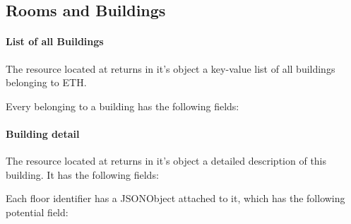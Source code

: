\subsection{Rooms and Buildings}

\paragraph{List of all Buildings}
The resource located at  returns in it's  object a key-value list of all buildings belonging to ETH.
\begin{description}
\end{description}
Every  belonging to a building has the following fields:
\begin{description}
\end{description}

\paragraph{Building detail}
The resource located at  returns in it's  object a detailed description of this building. It has the following fields:
\begin{description}
\end{description}
Each floor identifier has a JSONObject attached to it, which has the following potential field:
\begin{description}
\end{description}

